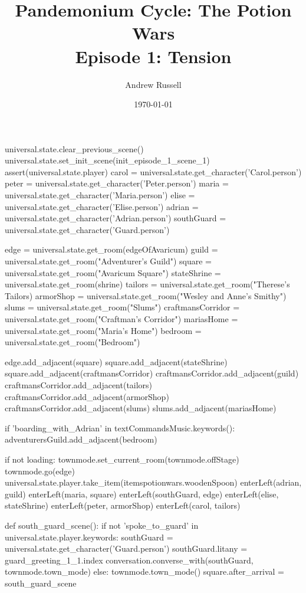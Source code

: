 \documentclass{book}
\title{Pandemonium Cycle: The Potion Wars \\ Episode 1: Tension}
\author{Andrew Russell}
\date{\today}
\begin{document}
\maketitle
\begin{openScene}
    universal.state.clear_previous_scene()
    universal.state.set_init_scene(init_episode_1_scene_1)
    assert(universal.state.player)
    carol = universal.state.get_character('Carol.person')
    peter = universal.state.get_character('Peter.person')
    maria = universal.state.get_character('Maria.person')
    elise = universal.state.get_character('Elise.person')
    adrian = universal.state.get_character('Adrian.person')
    southGuard = universal.state.get_character('Guard.person')
    
    edge = universal.state.get_room(edgeOfAvaricum)
    guild = universal.state.get_room("Adventurer's Guild")
    square = universal.state.get_room("Avaricum Square")
    stateShrine = universal.state.get_room(shrine)
    tailors = universal.state.get_room("Therese's Tailors)
    armorShop = universal.state.get_room("Wesley and Anne's Smithy")
    slums = universal.state.get_room("Slums")
    craftmansCorridor = universal.state.get_room("Craftman's Corridor")
    mariasHome = universal.state.get_room("Maria's Home")
    bedroom = universal.state.get_room("Bedroom")

    edge.add_adjacent(square)
    square.add_adjacent(stateShrine)
    square.add_adjacent(craftmansCorridor)
    craftmansCorridor.add_adjacent(guild)
    craftmansCorridor.add_adjacent(tailors)
    craftmansCorridor.add_adjacent(armorShop)
    craftmansCorridor.add_adjacent(slums)
    slums.add_adjacent(mariasHome)

    if 'boarding\_with\_Adrian' in textCommandsMusic.keywords():
        adventurersGuild.add_adjacent(bedroom)

    if not loading:
        townmode.set_current_room(townmode.offStage)
        townmode.go(edge)
        universal.state.player.take_item(itemspotionwars.woodenSpoon)
        enterLeft(adrian, guild)
        enterLeft(maria, square)
        enterLeft(southGuard, edge)
        enterLeft(elise, stateShrine)
        enterLeft(peter, armorShop)
        enterLeft(carol, tailors)

    def south_guard_scene(): 
        if not 'spoke_to_guard' in universal.state.player.keywords:
            southGuard = universal.state.get_character('Guard.person')
            southGuard.litany = guard_greeting_1_1.index
            conversation.converse_with(southGuard, townmode.town_mode)
        else:
            townmode.town_mode()
    square.after_arrival = south_guard_scene

\end{openScene}
\end{document}
